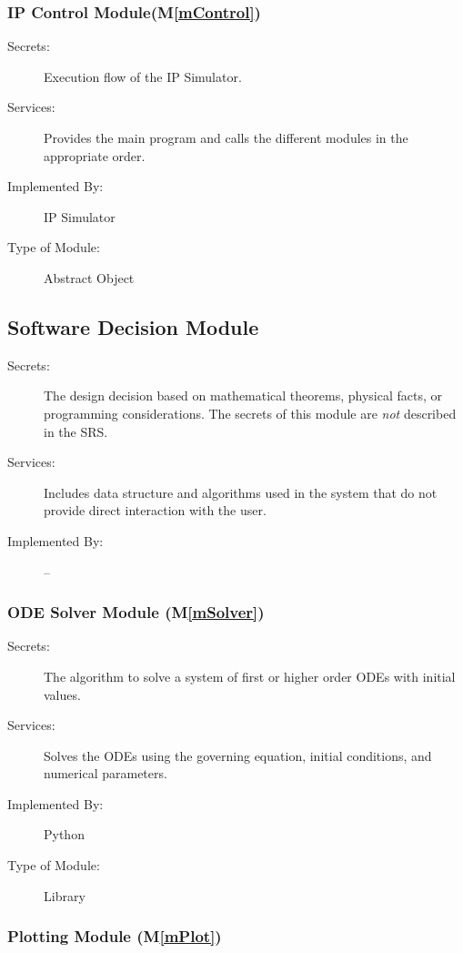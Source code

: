\documentclass[12pt, titlepage]{article}
\newcommand{\mref}[1]{M\ref{#1}}
\begin{document}
\subsubsection{IP Control Module(\mref{mControl})}

\begin{description}
\item[Secrets:] Execution flow of the IP Simulator. 
\item[Services:] Provides the main program and calls the different modules in the appropriate order.
\item[Implemented By:] IP Simulator
\item[Type of Module:] Abstract Object
\end{description} 


\subsection{Software Decision Module}

\begin{description}
\item[Secrets:] The design decision based on mathematical theorems, physical facts, or programming considerations. The secrets of this module are \emph{not} described in the SRS.
\item[Services:] Includes data structure and algorithms used in the system that do not provide direct interaction with the user. 
\item[Implemented By:] --
\end{description}
\subsubsection{ODE Solver Module (\mref{mSolver})}

\begin{description}
\item[Secrets:] The algorithm to solve a system of first or higher order ODEs with initial values.
\item[Services:] Solves the ODEs using the governing equation, initial conditions, and numerical parameters.
\item[Implemented By:] Python
\item[Type of Module:] Library
\end{description}

\subsubsection{Plotting Module (\mref{mPlot})}
\end{document}
